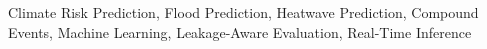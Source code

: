 \documentclass[conference]{IEEEtran}
\begin{document}
\begin{IEEEkeywords}
Climate Risk Prediction, Flood Prediction, Heatwave Prediction, Compound Events, Machine Learning, Leakage-Aware Evaluation, Real-Time Inference
\end{IEEEkeywords}











\end{document}
